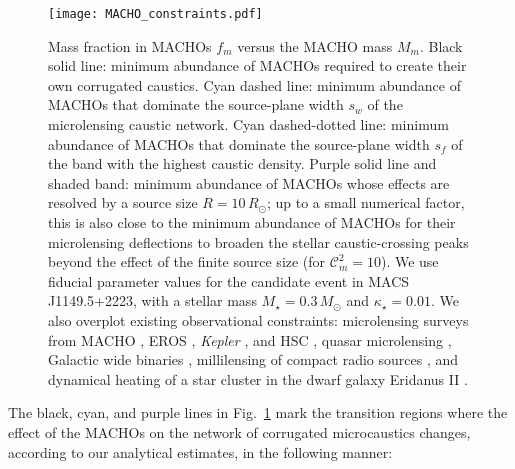 \documentclass{aastex6}
\newcommand{\reffig}[1]{Fig.~\ref{fig:#1}}
\begin{document}
\begin{figure}[t]
  \begin{center}
    \texttt{[image: MACHO\_constraints.pdf]}
    \caption{\label{fig:macholimit}
Mass fraction in MACHOs $f_m$ versus the MACHO mass $M_m$.
Black solid line: minimum abundance of MACHOs required to create their own corrugated caustics. Cyan dashed line: minimum abundance of MACHOs that dominate the source-plane width $s_w$ of the microlensing caustic network. Cyan dashed-dotted line: minimum abundance of MACHOs that dominate the source-plane width $s_f$ of the band with the highest caustic density. Purple solid line and shaded band: minimum abundance of MACHOs whose effects are resolved by a source size $R=10\, R_{\odot}$; up to a small numerical factor, this is also close to the minimum abundance of MACHOs for their microlensing deflections to broaden the stellar caustic-crossing peaks beyond the effect of the finite source size (for $\mathcal{C}^2_m = 10$). We use fiducial parameter values for the candidate event in MACS\,J1149.5+2223, with a stellar mass $M_\star = 0.3\,M_\odot$ and $\kappa_\star = 0.01$. We also overplot existing observational constraints: microlensing surveys from MACHO \citep{2001ApJ...550L.169A}, EROS \citep{2007A&A...469..387T}, {\em Kepler} \citep{PhysRevLett.111.181302}, and HSC \citep{2017arXiv170102151N}, quasar microlensing \citep{Mediavilla:2017bok}, Galactic wide binaries \citep{2009MNRAS.396L..11Q}, millilensing of compact radio sources \citep{Wilkinson:2001vv}, and dynamical heating of a star cluster in the dwarf galaxy Eridanus II \citep[][solid line for conservative consideration and dashed line for a more stringent limit]{2016ApJ...824L..31B}.}
  \end{center}
\end{figure}

The black, cyan, and purple lines in \reffig{macholimit} mark the transition regions where the effect of the MACHOs on the network of corrugated microcaustics changes, according to our analytical estimates, in the following manner:
\end{document}
